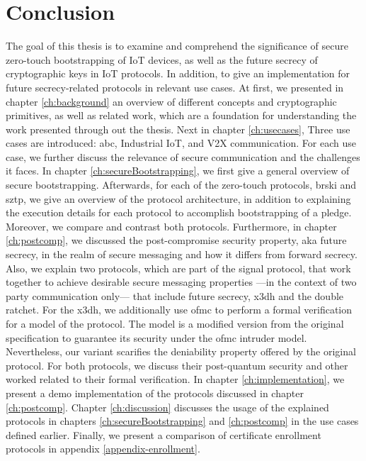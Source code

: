 \chapter{Conclusion}
\label{ch:conclusion}
The goal of this thesis is to examine and comprehend the significance of secure zero-touch bootstrapping of IoT devices, as well as the future secrecy of cryptographic keys in IoT protocols. In addition, to give an implementation for future secrecy-related protocols in relevant use cases.
At first, we presented in chapter \ref{ch:background} an overview of different concepts and cryptographic primitives, as well as related work, which are a foundation for understanding the work presented through out the thesis. Next in chapter \ref{ch:usecases}, Three use cases are introduced: \acrfull{abc}, Industrial IoT, and V2X communication. For each use case, we further discuss the relevance of secure communication and the challenges it faces. In chapter \ref{ch:secureBootstrapping}, we first give a general overview of secure bootstrapping. Afterwards, for each of the zero-touch protocols, \gls{brski} and \gls{sztp}, we give an overview of the protocol architecture, in addition to explaining the execution details for each protocol to accomplish bootstrapping of a pledge. Moreover, we compare and contrast both protocols. Furthermore, in chapter \ref{ch:postcomp}, we discussed the post-compromise security property, aka future secrecy, in the realm of secure messaging and how it differs from forward secrecy. Also, we explain two protocols, which are part of the signal protocol, that work together to achieve desirable secure messaging properties ---in the context of two party communication only--- that include future secrecy, \gls{x3dh} and the double ratchet. For the \gls{x3dh}, we additionally use \gls{ofmc} to perform a formal verification for a model of the protocol. The model is a modified version from the original specification to guarantee its security under the \gls{ofmc} intruder model. Nevertheless, our variant scarifies the deniability property offered by the original protocol. For both protocols, we discuss their post-quantum security and other worked related to their formal verification. In chapter \ref{ch:implementation}, we present a demo implementation of the protocols discussed in chapter \ref{ch:postcomp}. Chapter \ref{ch:discussion} discusses the usage of the explained protocols in chapters \ref{ch:secureBootstrapping} and \ref{ch:postcomp} in the use cases defined earlier. Finally, we present a comparison of certificate enrollment protocols in appendix \ref{appendix-enrollment}. 
